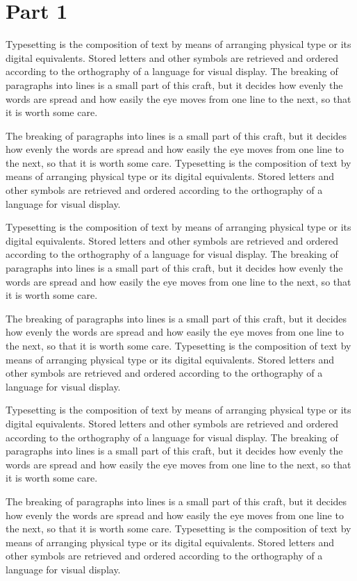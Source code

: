 \documentclass[parskip=half]{scrartcl}
\begin{document}
\section{Part 1}
Typesetting is the composition of text by means of arranging physical type or its digital equivalents. Stored letters and other symbols are retrieved and ordered according to the orthography of a language for visual display. The breaking of paragraphs into lines is a small part of this craft, but it decides how evenly the words are spread and how easily the eye moves from one line to the next, so that it is worth some care.

The breaking of paragraphs into lines is a small part of this craft, but it decides how evenly the words are spread and how easily the eye moves from one line to the next, so that it is worth some care. Typesetting is the composition of text by means of arranging physical type or its digital equivalents. Stored letters and other symbols are retrieved and ordered according to the orthography of a language for visual display.

Typesetting is the composition of text by means of arranging physical type or its digital equivalents. Stored letters and other symbols are retrieved and ordered according to the orthography of a language for visual display. The breaking of paragraphs into lines is a small part of this craft, but it decides how evenly the words are spread and how easily the eye moves from one line to the next, so that it is worth some care.

The breaking of paragraphs into lines is a small part of this craft, but it decides how evenly the words are spread and how easily the eye moves from one line to the next, so that it is worth some care. Typesetting is the composition of text by means of arranging physical type or its digital equivalents. Stored letters and other symbols are retrieved and ordered according to the orthography of a language for visual display.

Typesetting is the composition of text by means of arranging physical type or its digital equivalents. Stored letters and other symbols are retrieved and ordered according to the orthography of a language for visual display. The breaking of paragraphs into lines is a small part of this craft, but it decides how evenly the words are spread and how easily the eye moves from one line to the next, so that it is worth some care.

The breaking of paragraphs into lines is a small part of this craft, but it decides how evenly the words are spread and how easily the eye moves from one line to the next, so that it is worth some care. Typesetting is the composition of text by means of arranging physical type or its digital equivalents. Stored letters and other symbols are retrieved and ordered according to the orthography of a language for visual display.
\end{document}
